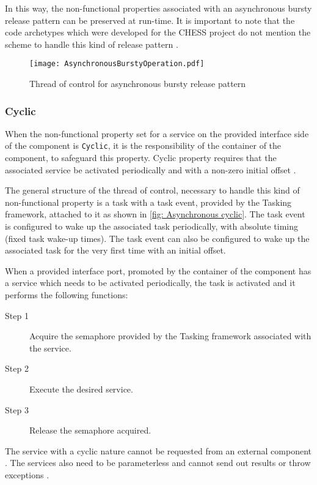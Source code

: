 In this way, the non-functional properties associated with an asynchronous bursty release pattern can be preserved at run-time. It is important to note that the code archetypes which were developed for the CHESS project do not mention the scheme to handle this kind of release pattern \cite{CharEvoRAVCodeAr}\cite{EvoRAVCodeAr}.

\begin{figure}[h]
	\centering
	\texttt{[image: AsynchronousBurstyOperation.pdf]}
	\caption{Thread of control for asynchronous bursty release pattern}
	\label{fig: Asynchronous bursty}
\end{figure}

\subsubsection{\textbf{Cyclic}} 
When the non-functional property set for a service on the provided interface side of the component is \texttt{Cyclic}, it is the responsibility of the container of the component, to safeguard this property. Cyclic property requires that the associated service be activated periodically and with a non-zero initial offset \cite{SpecMetamodel}\cite{CompBasedProcess}. 

The general structure of the thread of control, necessary to handle this kind of non-functional property is a task with a task event, provided by the Tasking framework, attached to it as shown in \cref{fig: Asynchronous cyclic}. The task event is configured to wake up the associated task periodically, with absolute timing (fixed task wake-up times). The task event can also be configured to wake up the associated task for the very first time with an initial offset.

When a provided interface port, promoted by the container of the component has a service which needs to be activated periodically, the task is activated and it performs the following functions:

\begin{description}
\item [Step 1] Acquire the semaphore provided by the Tasking framework associated with the service.
\item [Step 2] Execute the desired service.
\item [Step 3] Release the semaphore acquired. 
\end{description}    

The service with a cyclic nature cannot be requested from an external component \cite{SpecMetamodel}. The services also need to be parameterless and cannot send out results or throw exceptions \cite{SpecMetamodel}. 


